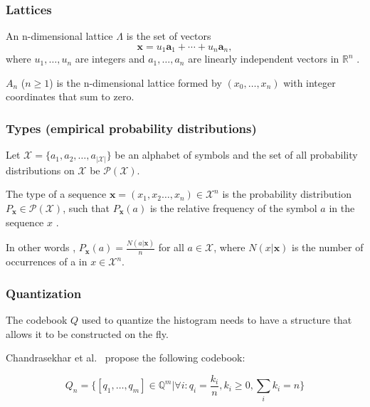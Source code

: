 \subsubsection{Lattices}

An n-dimensional lattice $\Lambda$ is the set of vectors
\begin{equation}
    \mathbf{x} = u_1 \mathbf{a}_1 + \cdots + u_n \mathbf{a}_n,
\end{equation}
where $u_1, \ldots, u_n$ are integers and $a_1, \ldots, a_n$ are linearly independent vectors in $\mathbb{R}^n$ \cite{ConwayS82a}.

$A_n$ ($n \geq 1$) is the n-dimensional lattice formed by $(x_0, \ldots, x_n)$ with integer coordinates that sum to zero.

\subsubsection{Types (empirical probability distributions)}
\label{sec:types}

Let $\mathcal{X} = \{a_1,a_2,\ldots,a_{\left|\mathcal{X}\right|}\}$ be an alphabet of symbols and the set of all probability distributions on $\mathcal{X}$ be $\mathcal{P}(\mathcal{X})$.

The type of a sequence $\mathbf{x} = (x_1, x_2 \ldots, x_n) \in \mathcal{X}^n$ is the probability distribution $P_{\mathbf{x}} \in \mathcal{P}(\mathcal{X})$, such that $P_{\mathbf{x}}(a)$ is the relative frequency of the symbol $a$ in the sequence $x$ \cite{methodoftypes}.

In other words \cite{infotheory}, $P_{\mathbf{x}}(a) = \frac{N(a|\mathbf{x})}{n}$ for all $a \in \mathcal{X}$, where $N(x|\mathbf{x})$ is the number of occurrences of a in $x \in \mathcal{X}^n$.

\subsubsection{Quantization}

The codebook $Q$ used to quantize the histogram needs to have a structure that allows it to be constructed on the fly.

Chandrasekhar et al.\ \cite{chog2011} propose the following codebook:

\begin{equation}
    Q_n = \{ [q_1,\ldots,q_m] \in \mathbb{Q}^m | \forall i: q_i = \frac{k_i}{n}, k_i \geq 0, \sum_i k_i = n \}
\end{equation}


